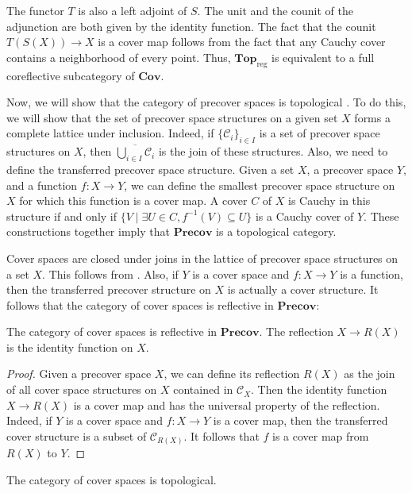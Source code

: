\documentclass[reqno]{amsart}
\theoremstyle{definition}
\theoremstyle{remark}
\numberwithin{figure}{section}
\newcommand{\cat}[1]{\mathbf{#1}}
\begin{document}
The functor $T$ is also a left adjoint of $S$.
The unit and the counit of the adjunction are both given by the identity function.
The fact that the counit $T(S(X)) \to X$ is a cover map follows from the fact that any Cauchy cover contains a neighborhood of every point.
Thus, $\cat{Top}_\mathrm{reg}$ is equivalent to a full coreflective subcategory of $\cat{Cov}$.

Now, we will show that the category of precover spaces is topological \cite[Definition~21.7]{joy-cats}.
To do this, we will show that the set of precover space structures on a given set $X$ forms a complete lattice under inclusion.
Indeed, if $\{ \mathcal{C}_i \}_{i \in I}$ is a set of precover space structures on $X$, then $\overline{\bigcup_{i \in I} \mathcal{C}_i}$ is the join of these structures.
Also, we need to define the transferred precover space structure.
Given a set $X$, a precover space $Y$, and a function $f : X \to Y$, we can define the smallest precover space structure on $X$ for which this function is a cover map.
A cover $C$ of $X$ is Cauchy in this structure if and only if $\{ V \mid \exists U \in C, f^{-1}(V) \subseteq U \}$ is a Cauchy cover of $Y$.
These constructions together imply that $\cat{Precov}$ is a topological category.

Cover spaces are closed under joins in the lattice of precover space structures on a set $X$.
This follows from .
Also, if $Y$ is a cover space and $f : X \to Y$ is a function, then the transferred precover structure on $X$ is actually a cover structure.
It follows that the category of cover spaces is reflective in $\cat{Precov}$:

\begin{prop}
The category of cover spaces is reflective in $\cat{Precov}$.
The reflection $X \to R(X)$ is the identity function on $X$.
\end{prop}
\begin{proof}
Given a precover space $X$, we can define its reflection $R(X)$ as the join of all cover space structures on $X$ contained in $\mathcal{C}_X$.
Then the identity function $X \to R(X)$ is a cover map and has the universal property of the reflection.
Indeed, if $Y$ is a cover space and $f : X \to Y$ is a cover map, then the transferred cover structure is a subset of $\mathcal{C}_{R(X)}$.
It follows that $f$ is a cover map from $R(X)$ to $Y$.
\end{proof}

\begin{cor}
The category of cover spaces is topological.
\end{cor}
\end{document}
